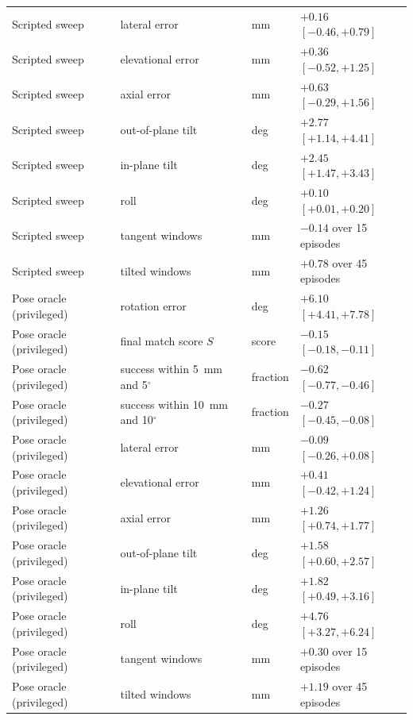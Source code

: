 \begin{table}[tp]
\begin{tabularx}{\textwidth}{@{}l >{\raggedright\arraybackslash}X l l@{}}
Scripted sweep & lateral error & mm & $+0.16$ $[-0.46, +0.79]$ \\
Scripted sweep & elevational error & mm & $+0.36$ $[-0.52, +1.25]$ \\
Scripted sweep & axial error & mm & $+0.63$ $[-0.29, +1.56]$ \\
Scripted sweep & out-of-plane tilt & deg & $+2.77$ $[+1.14, +4.41]$ \\
Scripted sweep & in-plane tilt & deg & $+2.45$ $[+1.47, +3.43]$ \\
Scripted sweep & roll & deg & $+0.10$ $[+0.01, +0.20]$ \\
Scripted sweep & tangent windows & mm & $-0.14$ over 15 episodes \\
Scripted sweep & tilted windows & mm & $+0.78$ over 45 episodes \\
Pose oracle (privileged) & rotation error & deg & $+6.10$ $[+4.41, +7.78]$ \\
Pose oracle (privileged) & final match score $S$ & score & $-0.15$ $[-0.18, -0.11]$ \\
Pose oracle (privileged) & success within 5~mm and 5$^\circ$ & fraction & $-0.62$ $[-0.77, -0.46]$ \\
Pose oracle (privileged) & success within 10~mm and 10$^\circ$ & fraction & $-0.27$ $[-0.45, -0.08]$ \\
Pose oracle (privileged) & lateral error & mm & $-0.09$ $[-0.26, +0.08]$ \\
Pose oracle (privileged) & elevational error & mm & $+0.41$ $[-0.42, +1.24]$ \\
Pose oracle (privileged) & axial error & mm & $+1.26$ $[+0.74, +1.77]$ \\
Pose oracle (privileged) & out-of-plane tilt & deg & $+1.58$ $[+0.60, +2.57]$ \\
Pose oracle (privileged) & in-plane tilt & deg & $+1.82$ $[+0.49, +3.16]$ \\
Pose oracle (privileged) & roll & deg & $+4.76$ $[+3.27, +6.24]$ \\
Pose oracle (privileged) & tangent windows & mm & $+0.30$ over 15 episodes \\
Pose oracle (privileged) & tilted windows & mm & $+1.19$ over 45 episodes \\
\bottomrule
\end{tabularx}
\end{table}
